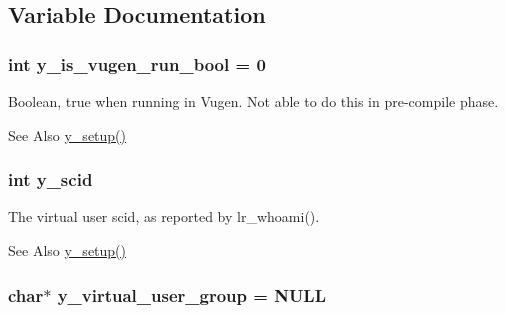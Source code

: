 \subsection{Variable Documentation}
\hypertarget{group__core_ga6946e1e353167a7a711e3ddcb8a39b6d}{
\subsubsection[{y\-\_\-is\-\_\-vugen\-\_\-run\-\_\-bool}]{\setlength{\rightskip}{0pt plus 5cm}int y\-\_\-is\-\_\-vugen\-\_\-run\-\_\-bool = 0}}\label{group__core_ga6946e1e353167a7a711e3ddcb8a39b6d}


Boolean, true when running in Vugen. Not able to do this in pre-\/compile phase. 

\begin{DoxySeeAlso}{See Also}
\hyperlink{group__core_ga7350ca6bb0383b2169ef4eaae3b091e7}{y\-\_\-setup()} 
\end{DoxySeeAlso}
\hypertarget{group__core_ga1ebd23898db36692c02dd58d9649f4a1}{
\subsubsection[{y\-\_\-scid}]{\setlength{\rightskip}{0pt plus 5cm}int y\-\_\-scid}}\label{group__core_ga1ebd23898db36692c02dd58d9649f4a1}


The virtual user scid, as reported by lr\-\_\-whoami(). 

\begin{DoxySeeAlso}{See Also}
\hyperlink{group__core_ga7350ca6bb0383b2169ef4eaae3b091e7}{y\-\_\-setup()} 
\end{DoxySeeAlso}
\hypertarget{group__core_ga36fcd2d9a92671f11bfebf8b7bfa34ae}{
\subsubsection[{y\-\_\-virtual\-\_\-user\-\_\-group}]{\setlength{\rightskip}{0pt plus 5cm}char$\ast$ y\-\_\-virtual\-\_\-user\-\_\-group = N\-U\-L\-L}}\label{group__core_ga36fcd2d9a92671f11bfebf8b7bfa34ae}


